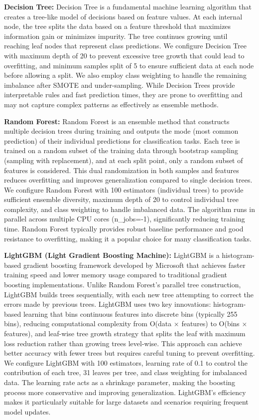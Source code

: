 \documentclass[conference]{IEEEtran}
\begin{document}
\textbf{Decision Tree:} Decision Tree is a fundamental machine learning algorithm that creates a tree-like model of decisions based on feature values. At each internal node, the tree splits the data based on a feature threshold that maximizes information gain or minimizes impurity. The tree continues growing until reaching leaf nodes that represent class predictions. We configure Decision Tree with maximum depth of 20 to prevent excessive tree growth that could lead to overfitting, and minimum samples split of 5 to ensure sufficient data at each node before allowing a split. We also employ class weighting to handle the remaining imbalance after SMOTE and under-sampling. While Decision Trees provide interpretable rules and fast prediction times, they are prone to overfitting and may not capture complex patterns as effectively as ensemble methods.

\textbf{Random Forest:} Random Forest is an ensemble method that constructs multiple decision trees during training and outputs the mode (most common prediction) of their individual predictions for classification tasks. Each tree is trained on a random subset of the training data through bootstrap sampling (sampling with replacement), and at each split point, only a random subset of features is considered. This dual randomization in both samples and features reduces overfitting and improves generalization compared to single decision trees. We configure Random Forest with 100 estimators (individual trees) to provide sufficient ensemble diversity, maximum depth of 20 to control individual tree complexity, and class weighting to handle imbalanced data. The algorithm runs in parallel across multiple CPU cores (n\_jobs=-1), significantly reducing training time. Random Forest typically provides robust baseline performance and good resistance to overfitting, making it a popular choice for many classification tasks.

\textbf{LightGBM (Light Gradient Boosting Machine):} LightGBM is a histogram-based gradient boosting framework developed by Microsoft that achieves faster training speed and lower memory usage compared to traditional gradient boosting implementations. Unlike Random Forest's parallel tree construction, LightGBM builds trees sequentially, with each new tree attempting to correct the errors made by previous trees. LightGBM uses two key innovations: histogram-based learning that bins continuous features into discrete bins (typically 255 bins), reducing computational complexity from O(data × features) to O(bins × features), and leaf-wise tree growth strategy that splits the leaf with maximum loss reduction rather than growing trees level-wise. This approach can achieve better accuracy with fewer trees but requires careful tuning to prevent overfitting. We configure LightGBM with 100 estimators, learning rate of 0.1 to control the contribution of each tree, 31 leaves per tree, and class weighting for imbalanced data. The learning rate acts as a shrinkage parameter, making the boosting process more conservative and improving generalization. LightGBM's efficiency makes it particularly suitable for large datasets and scenarios requiring frequent model updates.
\end{document}
